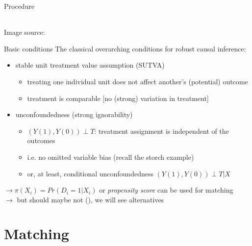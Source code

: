 \documentclass[aspectratio=169]{beamer}
\begin{document}
		\begin{frame}{Procedure}
			\begin{center}
				\\\tiny{ Image source: \cite{Schleicher2020}}
			\end{center}
		\end{frame}

		\begin{frame}{Basic conditions}
			The classical overarching conditions for robust causal inference:
			\\ \vspace*{.25cm}
			\begin{itemize}
				\item stable unit treatment value assumption (SUTVA)
				\begin{itemize}
					\item treating one individual unit does not affect another's (potential) outcome
					\item treatment is comparable [no (strong) variation in treatment]
				\end{itemize}
				\item<2-> unconfoundedness (strong ignorability)
				\begin{itemize}
					\item<2-> $(Y(1), Y(0)) \perp T$: treatment assignment is independent of the outcomes
					\item<2-> i.e. no omitted variable bias (recall the storch example)
					\item<2-> or, at least, conditional unconfoundedness  $(Y(1), Y(0)) \perp T {}|{} X$
				\end{itemize}
			\end{itemize}
			\vspace*{.25cm}  {$\rightarrow \pi(X_i) = Pr(D_i = 1 | X_i)$ or \textit{propensity score} can be used for matching}
			\\ \onslide<4> {$\rightarrow$ but should maybe not (\cite{King2019}), we will see alternatives }
		\end{frame}

\section{Matching}
\end{document}
